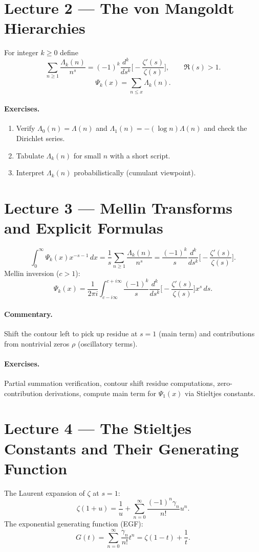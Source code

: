 \documentclass[11pt]{article}
\newcommand{\LM}{\Lambda}
\newcommand{\z}{\zeta}
\begin{document}
\section{Lecture 2 --- The von Mangoldt Hierarchies}
For integer $k\ge0$ define
\[
\sum_{n\ge1}\frac{\LM_k(n)}{n^s}=(-1)^k\frac{d^k}{ds^k}\!\Big[-\frac{\z'(s)}{\z(s)}\Big],\qquad \Re(s)>1.
\]
\[
\Psi_k(x)=\sum_{n\le x}\LM_k(n).
\]

\paragraph{Exercises.}
\begin{enumerate}
\item Verify $\LM_0(n)=\LM(n)$ and $\LM_1(n)=-(\log n)\LM(n)$ and check the Dirichlet series.
\item Tabulate $\LM_k(n)$ for small $n$ with a short script.
\item Interpret $\LM_k(n)$ probabilistically (cumulant viewpoint).
\end{enumerate}

\section{Lecture 3 --- Mellin Transforms and Explicit Formulas}
\[
\int_0^\infty \Psi_k(x)x^{-s-1}\,dx=\frac{1}{s}\sum_{n\ge1}\frac{\LM_k(n)}{n^s}
=\frac{(-1)^k}{s}\frac{d^k}{ds^k}\!\Big[-\frac{\z'(s)}{\z(s)}\Big].
\]
Mellin inversion ($c>1$):
\[
\Psi_k(x)=\frac{1}{2\pi i}\int_{c-i\infty}^{c+i\infty}\frac{(-1)^k}{s}\frac{d^k}{ds^k}\!\Big[-\frac{\z'(s)}{\z(s)}\Big]x^s\,ds.
\]

\paragraph{Commentary.} Shift the contour left to pick up residue at $s=1$ (main term) and contributions from nontrivial zeros $\rho$ (oscillatory terms).

\paragraph{Exercises.} Partial summation verification, contour shift residue computations, zero-contribution derivations, compute main term for $\Psi_1(x)$ via Stieltjes constants.

\section{Lecture 4 --- The Stieltjes Constants and Their Generating Function}
The Laurent expansion of $\zeta$ at $s=1$:
\[
\zeta(1+u)=\frac{1}{u}+\sum_{n=0}^\infty\frac{(-1)^n\gamma_n}{n!}u^n.
\]
The exponential generating function (EGF):
\[
G(t)=\sum_{n=0}^\infty\frac{\gamma_n}{n!}t^n=\zeta(1-t)+\frac{1}{t}.
\]
\end{document}
